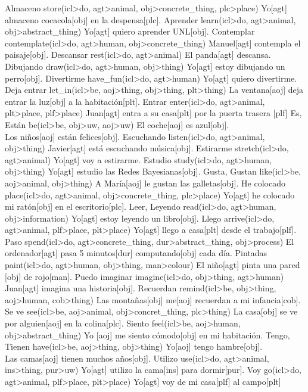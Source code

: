 \documentclass{article}
\begin{document}
{
    \uw
    {Almaceno}
    {store(icl>do, agt>animal, obj>concrete\_thing, plc>place)}
    {Yo[agt] almaceno cocacola[obj] en la despensa[plc].}
    \uw
    {Aprender}
    {learn(icl>do, agt>animal, obj>abstract\_thing)}
    {Yo[agt] quiero aprender UNL[obj].}
    \uw
    {Contemplar}
    {contemplate(icl>do, agt>human, obj>concrete\_thing)}
    {Manuel[agt] contempla el paisaje[obj].}
    \uw
    {Descansar}
    {rest(icl>do, agt>animal)}
    {El panda[agt] descansa.}
    \uw
    {Dibujando}
    {draw(icl>do, agt>human, obj>thing)}
    {Yo[agt] estoy dibujando un perro[obj].}
    \uw
    {Divertirme}
    {have\_fun(icl>do, agt>human)}
    {Yo[agt] quiero divertirme.}
    \uw
    {Deja entrar}
    {let\_in(icl>be, aoj>thing, obj>thing, plt>thing)}
    {La ventana[aoj] deja entrar la luz[obj] a la habitación[plt].}
    \uw
    {Entrar}
    {enter(icl>do, agt>animal, plt>place, plf>place)}
    {Juan[agt] entra a su casa[plt] por la puerta trasera [plf]}
    \uw
    {Es, Están}
    {be(icl>be, obj>uw, aoj>uw)}
    {El coche[aoj] es azul[obj].\\
    Los niños[aoj] están felices[obj].}
    \uw
    {Escuchando}
    {listen(icl>do, agt>animal, obj>thing)}
    {Javier[agt] está escuchando música[obj].}
    \uw
    {Estirarme}
    {stretch(icl>do, agt>animal)}
    {Yo[agt] voy a estirarme.}
    \uw
    {Estudio}
    {study(icl>do, agt>human, obj>thing)}
    {Yo[agt] estudio las Redes Bayesianas[obj].}
    \uw
    {Gusta, Gustan}
    {like(icl>be, aoj>animal, obj>thing)}
    {A María[aoj] le gustan las galletas[obj].}
    \uw
    {He colocado}
    {place(icl>do, agt>animal, obj>concrete\_thing, plc>place)}
    {Yo[agt] he colocado mi ratón[obj] en el escritorio[plc].}
    \uw
    {Leer, Leyendo}
    {read(icl>do, agt>human, obj>information)}
    {Yo[agt] estoy leyendo un libro[obj].}
    \uw
    {Llego}
    {arrive(icl>do, agt>animal, plf>place, plt>place)}
    {Yo[agt] llego a casa[plt] desde el trabajo[plf].}
    \uw
    {Paso}
    {spend(icl>do, agt>concrete\_thing, dur>abstract\_thing, obj>process)}
    {El ordenador[agt] pasa 5 minutos[dur] computando[obj] cada día.}
    \uw
    {Pintadas}
    {paint(icl>do, agt>human, obj>thing, man>colour)}
    {El niño[agt] pinta una pared [obj] de rojo[man].}
    \uw
    {Puedo imaginar}
    {imagine(icl>do, obj>thing, agt>human)}
    {Juan[agt] imagina una historia[obj].}
    \uw
    {Recuerdan}
    {remind(icl>be, obj>thing, aoj>human, cob>thing)}
    {Las montañas[obj] me[aoj] recuerdan a mi infancia[cob].}
    \uw
    {Se ve}
    {see(icl>be, aoj>animal, obj>concret\_thing, plc>thing)}
    {La casa[obj] se ve por alguien[aoj] en la colina[plc].}
    \uw
    {Siento}
    {feel(icl>be, aoj>human, obj>abstract\_thing)}
    {Yo [aoj] me siento cómodo[obj] en mi habitación.}
    \uw
    {Tengo, Tienen}
    {have(icl>be, aoj>thing, obj>thing)}
    {Yo[aoj] tengo hambre[obj].\\
    Las camas[aoj] tienen muchos años[obj].}
    \uw
    {Utilizo}
    {use(icl>do, agt>animal, ins>thing, pur>uw)}
    {Yo[agt] utilizo la cama[ins] para dormir[pur].}
    \uw
    {Voy}
    {go(icl>do, agt>animal, plf>place, plt>place)}
    {Yo[agt] voy de mi casa[plf] al campo[plt]}
}
\end{document}

